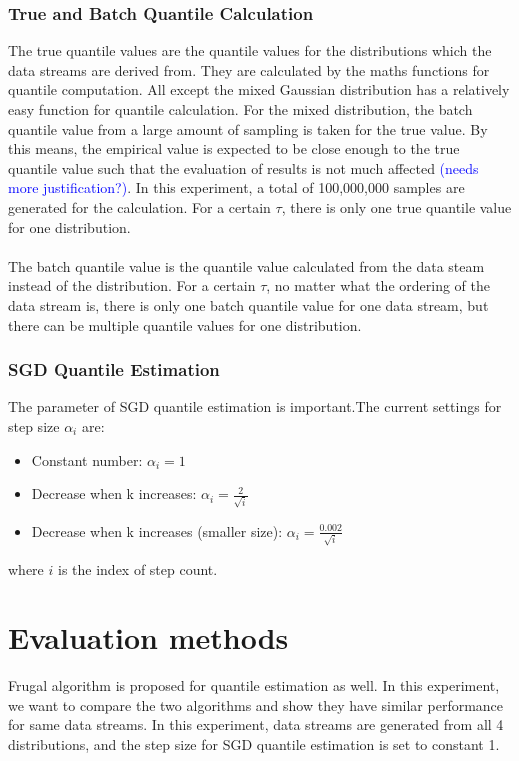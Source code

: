\subsubsection{True and Batch Quantile Calculation}

The true quantile values are the quantile values for the distributions which the data streams are derived from. They are calculated by the maths functions for quantile computation. All except the mixed Gaussian distribution has a relatively easy function for quantile calculation. For the mixed distribution, the batch quantile value from a large amount of sampling is taken for the true value. By this means, the empirical value is expected to be close enough to the true quantile value such that the evaluation of results is not much affected \textcolor{blue}{(needs more justification?)}. In this experiment, a total of 100,000,000 samples are generated for the calculation. For a certain $\tau$, there is only one true quantile value for one distribution.
\\\\
The batch quantile value is the quantile value calculated from the data steam instead of the distribution. For a certain $\tau$, no matter what the ordering of the data stream is, there is only one batch quantile value for one data stream, but there can be multiple quantile values for one distribution.

\subsubsection{SGD Quantile Estimation}

The parameter of SGD quantile estimation is important.The current settings for step size $\alpha_i$ are:
\begin{itemize}
    \item Constant number: $\alpha_i =1$
    \item Decrease when k increases: $\alpha_i= \frac{2}{\sqrt{i}}$
    \item Decrease when k increases (smaller size): $\alpha_i= \frac{0.002}{\sqrt{i}}$
\end{itemize}
where $i$ is the index of step count.

\section{Evaluation methods}
\label{sec: evaluation}
Frugal algorithm is proposed for quantile estimation as well. In this experiment, we want to compare the two algorithms and show they have similar performance for same data streams. In this experiment, data streams are generated from all 4 distributions, and the step size for SGD quantile estimation is set to constant 1.

